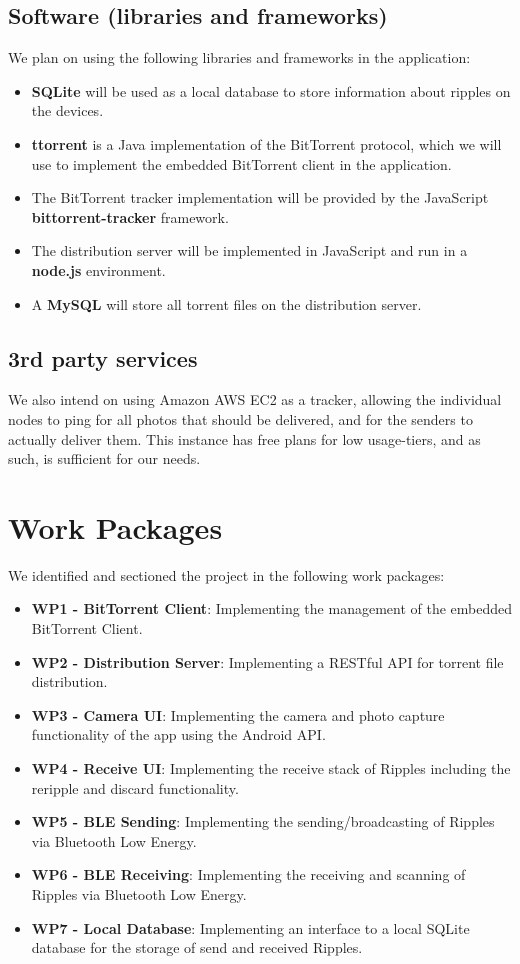 \documentclass{report}
\begin{document}
\subsection{Software (libraries and frameworks)}
We plan on using the following libraries and frameworks in the application:
\begin{itemize}
  \item \textbf{SQLite} \cite{sqliteLink} will be used as a local database to store information about ripples on the devices.
  \item \textbf{ttorrent} \cite{ttorrentLink} is a Java implementation of the BitTorrent protocol, which we will use to implement the embedded BitTorrent client in the application.
  \item The BitTorrent tracker implementation will be provided by the JavaScript \textbf{bittorrent-tracker} \cite{bittorrentTrackerLink} framework.
  \item The distribution server will be implemented in JavaScript and run in a \textbf{node.js} \cite{nodejsLink} environment.
  \item A \textbf{MySQL} \cite{MySQLLink} will store all torrent files on the distribution server.
\end{itemize}

\subsection{3rd party services}
We also intend on using Amazon AWS EC2  as a tracker, allowing the individual nodes to ping for all photos that should be delivered, and for the senders to actually deliver them.
This instance has free plans for low usage-tiers, and as such, is sufficient for our needs.

\section{Work Packages}
We identified and sectioned the project in the following work packages: 

\begin{itemize}
    \item {\bf WP1 - BitTorrent Client}: Implementing the management of the embedded BitTorrent Client.
    \item {\bf WP2 - Distribution Server}: Implementing a RESTful API for torrent file distribution.
    \item {\bf WP3 - Camera UI}: Implementing the camera and photo capture functionality of the app using the Android API.
    \item {\bf WP4 - Receive UI}: Implementing the receive stack of Ripples including the reripple and discard functionality.
    \item {\bf WP5 - BLE Sending}: Implementing the sending/broadcasting of Ripples via Bluetooth Low Energy.
    \item {\bf WP6 - BLE Receiving}: Implementing the receiving and scanning of Ripples via Bluetooth Low Energy.
    \item {\bf WP7 - Local Database}: Implementing an interface to a local SQLite database for the storage of send and received Ripples.
\end{itemize}
\end{document}

